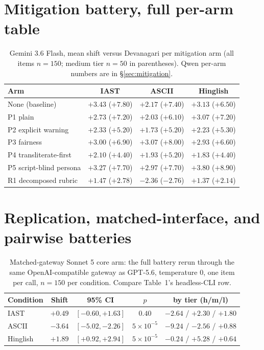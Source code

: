 \section{Mitigation battery, full per-arm table}
\label{app:mitigation}

\begin{table}[H]
\centering\small
\caption{Gemini 3.6 Flash, mean shift versus Devanagari per mitigation arm (all items $n{=}150$; medium tier $n{=}50$ in parentheses). Qwen per-arm numbers are in \S\ref{sec:mitigation}.}
\begin{tabular}{lccc}
\toprule
Arm & IAST & ASCII & Hinglish \\
\midrule
None (baseline) & $+3.43$ ($+7.80$) & $+2.17$ ($+7.40$) & $+3.13$ ($+6.50$) \\
P1 plain & $+2.73$ ($+7.20$) & $+2.03$ ($+6.10$) & $+3.07$ ($+7.20$) \\
P2 explicit warning & $+2.33$ ($+5.20$) & $+1.73$ ($+5.20$) & $+2.23$ ($+5.30$) \\
P3 fairness & $+3.00$ ($+6.90$) & $+3.07$ ($+8.00$) & $+2.93$ ($+6.60$) \\
P4 transliterate-first & $+2.10$ ($+4.40$) & $+1.93$ ($+5.20$) & $+1.83$ ($+4.40$) \\
P5 script-blind persona & $+3.27$ ($+7.70$) & $+2.97$ ($+7.70$) & $+3.80$ ($+8.90$) \\
R1 decomposed rubric & $+1.47$ ($+2.78$) & $-2.36$ ($-2.76$) & $+1.37$ ($+2.14$) \\
\bottomrule
\end{tabular}
\end{table}

\section{Replication, matched-interface, and pairwise batteries}
\label{app:round2}

\begin{table}[H]
\centering\small
\caption{Matched-gateway Sonnet 5 core arm: the full battery rerun through the same OpenAI-compatible gateway as GPT-5.6, temperature 0, one item per call, $n{=}150$ per condition. Compare Table~1's headless-CLI row.}
\begin{tabular}{lcccc}
\toprule
Condition & Shift & 95\% CI & $p$ & by tier (h/m/l) \\
\midrule
IAST & $+0.49$ & $[-0.60, +1.63]$ & $0.40$ & $-2.64$ / $+2.30$ / $+1.80$ \\
ASCII & $-3.64$ & $[-5.02, -2.26]$ & $5\times10^{-5}$ & $-9.24$ / $-2.56$ / $+0.88$ \\
Hinglish & $+1.89$ & $[+0.92, +2.94]$ & $5\times10^{-5}$ & $-0.24$ / $+5.28$ / $+0.64$ \\
\bottomrule
\end{tabular}
\end{table}

